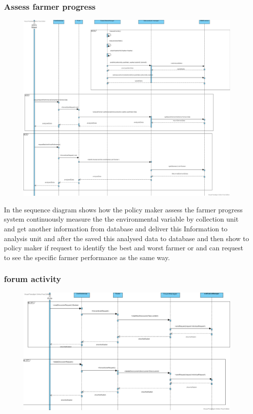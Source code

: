 \subsubsection{Assess farmer progress }
\begin{figure}[H]
\includegraphics[width=1\textwidth]{figures/RunTimeSequenceDiagram-Page-3.png}
\end{figure}

In the sequence diagram shows how the policy maker assess  the farmer progress system continuously measure the the environmental variable by collection unit and get another information from database  and deliver this Information to analysis unit and after the saved this analysed data to database and then show to  policy maker if request to identify the best and worst farmer or and can request to see the specific farmer performance as the same way.
\subsubsection{forum activity}
\begin{figure}[H]
\includegraphics[width=1\textwidth]{figures/RunTimeSequenceDiagram-Page-4.png}
\end{figure}


